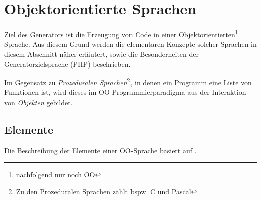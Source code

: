 \section{Objektorientierte Sprachen}
\label{sec:oo_languages}

Ziel des Generators ist die Erzeugung von Code in einer Objektorientierten\footnote{nachfolgend nur noch OO} Sprache. Aus diesem Grund werden die elementaren Konzepte solcher Sprachen in diesem Abschnitt näher erläutert, sowie die Besonderheiten der Generatorzielsprache (PHP) beschrieben.

Im Gegensatz zu \emph{Prozeduralen Sprachen}\footnote{Zu den Prozeduralen Sprachen zählt bspw. C und Pascal}, in denen ein Programm eine Liste von Funktionen ist, wird dieses im OO-Programmierparadigma aus der Interaktion von \emph{Objekten} gebildet. 


\subsection{Elemente}
\label{sec:elements_of_object_oriented_languages}

Die Beschreibung der Elemente einer OO-Sprache basiert auf \cite{oopSkript2012}.

